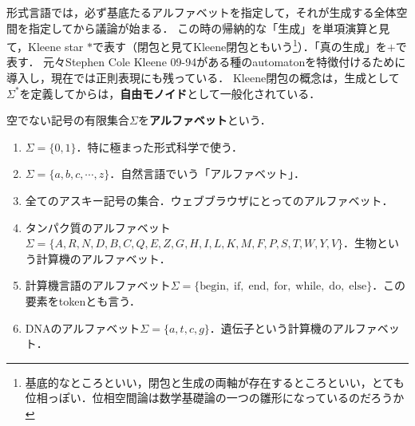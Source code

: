 \documentclass[uplatex, dvipdfmx]{jsreport}
\begin{document}
\begin{tcolorbox}[colframe=ForestGreen, colback=ForestGreen!10!white, breakable]
    形式言語では，必ず基底たるアルファベットを指定して，それが生成する全体空間を指定してから議論が始まる．
    この時の帰納的な「生成」を単項演算と見て，Kleene star $*$で表す（閉包と見てKleene閉包ともいう\footnote{基底的なところといい，閉包と生成の両軸が存在するところといい，とても位相っぽい．位相空間論は数学基礎論の一つの雛形になっているのだろうか}）．「真の生成」を$+$で表す．
    元々Stephen Cole Kleene 09-94がある種のautomatonを特徴付けるために導入し，現在では正則表現にも残っている．
    Kleene閉包の概念は，生成として$\Sigma^*$を定義してからは，\textbf{自由モノイド}として一般化されている．
\end{tcolorbox}

\begin{definition}[alphabet]
    空でない記号の有限集合$\Sigma$を\textbf{アルファベット}という．
\end{definition}
\begin{example}[アルファベットの例]\mbox{}
    \begin{enumerate}
        \item $\Sigma=\{0,1\}$．特に極まった形式科学で使う．
        \item $\Sigma=\{a,b,c,\cdots,z\}$．自然言語でいう「アルファベット」．
        \item 全てのアスキー記号の集合．ウェブブラウザにとってのアルファベット．
        \item タンパク質のアルファベット$\Sigma=\{A,R,N,D,B,C,Q,E,Z,G,H,I,L,K,M,F,P,S,T,W,Y,V\}$．生物という計算機のアルファベット．
        \item 計算機言語のアルファベット$\Sigma=\{\mathrm{begin,\;if,\;end,\;for,\;while,\;do,\;else}\}$．この要素をtokenとも言う．
        \item DNAのアルファベット$\Sigma=\{a,t,c,g\}$．遺伝子という計算機のアルファベット．
    \end{enumerate}
\end{example}
\end{document}
